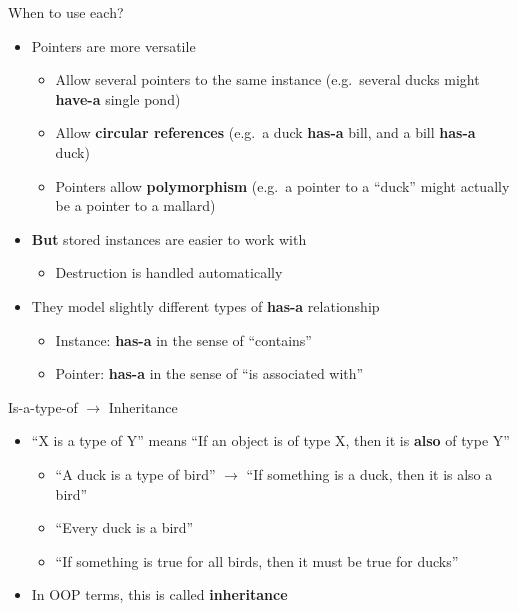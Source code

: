 \begin{frame}{When to use each?}
    \begin{itemize}
        \item Pointers are more versatile \pause
            \begin{itemize}
                \item Allow several pointers to the same instance (e.g.\ several ducks might \textbf{have-a} single pond) \pause
                \item Allow \textbf{circular references} (e.g.\ a duck \textbf{has-a} bill, and a bill \textbf{has-a} duck) \pause
                \item Pointers allow \textbf{polymorphism} (e.g.\ a pointer to a ``duck'' might actually be a pointer to a mallard) \pause
            \end{itemize}
        \item \textbf{But} stored instances are easier to work with \pause
            \begin{itemize}
                \item Destruction is handled automatically \pause
            \end{itemize}
        \item They model slightly different types of \textbf{has-a} relationship \pause
            \begin{itemize}
                \item Instance: \textbf{has-a} in the sense of ``contains'' \pause
                \item Pointer: \textbf{has-a} in the sense of ``is associated with''
            \end{itemize}
    \end{itemize}
\end{frame}

\begin{frame}{Is-a-type-of $\to$ Inheritance}
\begin{itemize}
	\pause\item ``X is a type of Y'' means ``If an object is of type X, then it is \textbf{also} of type Y''
	\begin{itemize}
		\pause\item ``A duck is a type of bird'' $\to$ ``If something is a duck, then it is also a bird''
		\pause\item ``Every duck is a bird''
		\pause\item ``If something is true for all birds, then it must be true for ducks''
	\end{itemize}
	\pause\item In OOP terms, this is called \textbf{inheritance}
\end{itemize}
\end{frame}

